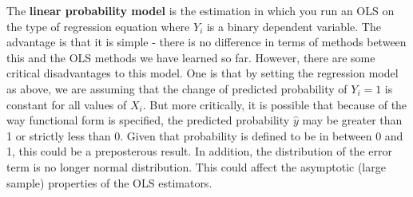 \documentclass[12pt]{article}
\theoremstyle{definition}
\theoremstyle{property}
\theoremstyle{assumption}
\theoremstyle{example}
\theoremstyle{comment}
\begin{document}
The \textbf{linear probability model} is the estimation in which you run an OLS on the type of regression equation where $Y_i$ is a binary dependent variable. The advantage is that it is simple - there is no difference in terms of methods between this and the OLS methods we have learned so far. However, there are some critical disadvantages to this model. One is that by setting the regression model as above, we are assuming that the change of predicted probability of $Y_i=1$ is constant for all values of $X_i$. But more critically, it is possible that because of the way functional form is specified, the predicted probability $\hat{y}$ may be greater than 1 or strictly less than 0. Given that probability is defined to be in between 0 and 1, this could be a preposterous result. In addition, the distribution of the error term is no longer normal distribution. This could affect the asymptotic (large sample) properties of the OLS estimators. \par\medskip
\end{document}
